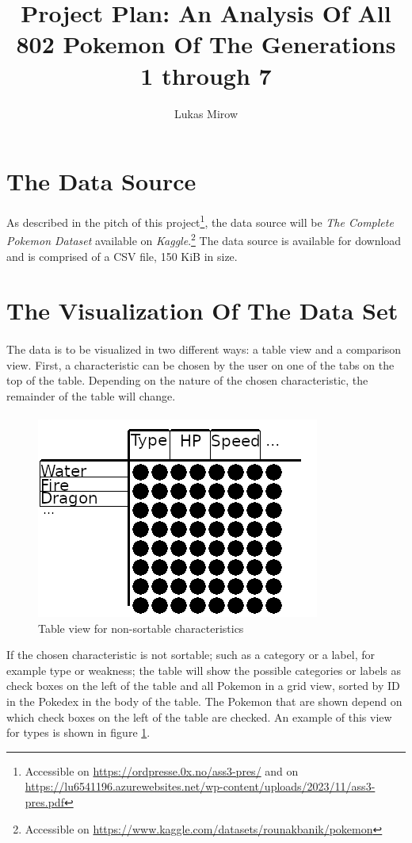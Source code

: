 \documentclass[12pt, a4paper]{article}
\title{Project Plan: An Analysis Of All 802 Pokemon Of The Generations 1 through 7}
\author{Lukas Mirow}
\begin{document}
	\maketitle
	\tableofcontents
	\newpage

	\section{The Data Source}
		As described in the pitch of this project\footnote{Accessible on \href{https://ordpresse.0x.no/ass3-pres/}{https://ordpresse.0x.no/ass3-pres/} and on \href{https://lu6541196.azurewebsites.net/wp-content/uploads/2023/11/ass3-pres.pdf}{https://lu6541196.azurewebsites.net/wp-content/uploads/2023/11/ass3-pres.pdf}}, the data source will be \textit{The Complete Pokemon Dataset} available on \textit{Kaggle}.\footnote{Accessible on \href{https://www.kaggle.com/datasets/rounakbanik/pokemon}{https://www.kaggle.com/datasets/rounakbanik/pokemon}} The data source is available for download and is comprised of a CSV file, 150 KiB in size.

	\section{The Visualization Of The Data Set}
		\paragraph{}
			The data is to be visualized in two different ways: a table view and a comparison view. First, a characteristic can be chosen by the user on one of the tabs on the top of the table. Depending on the nature of the chosen characteristic, the remainder of the table will change.
		\paragraph{}
			\begin{figure}[h]
				\centering
				\includegraphics[width=0.5\linewidth]{table-ns.png}
				\caption{Table view for non-sortable characteristics}
				\label{fig:ns}
			\end{figure}
			If the chosen characteristic is not sortable; such as a category or a label, for example type or weakness; the table will show the possible categories or labels as check boxes on the left of the table and all Pokemon in a grid view, sorted by ID in the Pokedex in the body of the table. The Pokemon that are shown depend on which check boxes on the left of the table are checked. An example of this view for types is shown in figure \ref{fig:ns}.
		\pagebreak
\end{document}
